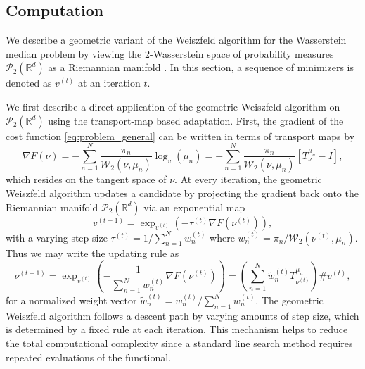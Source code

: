 \documentclass[11pt]{article}
\newcommand{\calP}{\mathcal{P}}
\newcommand{\calW}{\mathcal{W}}
\newcommand{\bbR}{\mathbb{R}}
\begin{document}
\subsection{Computation}

We describe a geometric variant of the Weiszfeld algorithm \citep{weiszfeld_1937_PointPourLequel, fletcher_2009_GeometricMedianRiemannian} for the Wasserstein median problem by viewing the 2-Wasserstein space of probability measures $\calP_2 (\bbR^d)$ as a Riemannian manifold \citep{ambrosio_2021_LecturesOptimalTransport}. In this section, a sequence of minimizers is denoted as $v^{(t)}$ at an iteration $t$. 

We first describe a direct application of the geometric Weiszfeld algorithm on $ \calP_2(\bbR^d)$ using the transport-map based adaptation. First, the gradient of the cost function \eqref{eq:problem_general} can be written in terms of transport maps by
\begin{equation*}
	\nabla F(\nu) = -\sum_{n=1}^N \frac{\pi_n}{\calW_2 (\nu, \mu_n)} \log_v (\mu_n) = -\sum_{n=1}^N \frac{\pi_n}{\calW_2 (\nu, \mu_n)} \left\lbrack T_\nu^{\mu_n} - I \right\rbrack,
\end{equation*}
which resides on the tangent space of $\nu$. At every iteration, the geometric Weiszfeld algorithm updates a candidate by projecting the gradient back onto the Riemannian manifold $\calP_2 (\bbR^d)$ via an exponential map
\begin{equation*}
	v^{(t+1)} = \exp_{v^{(t)}} \left( -\tau^{(t)} \nabla F(\nu^{(t)}) \right),
\end{equation*}
with a varying step size $\tau^{(t)} = 1/\sum_{n=1}^N w_n^{(t)}$ where $w_n^{(t)} = \pi_n / \calW_2 (\nu^{(t)},\mu_n)$. Thus we may write the updating rule as 
\begin{equation}\label{eq:weiszfeld_map}
	\nu^{(t+1)} 
	= \exp_{v^{(t)}} \left(-\frac{1}{\sum_{n=1}^N w_n^{(t)}} \nabla F (\nu^{(t)}) \right)
	= \left(\sum_{n=1}^N  \tilde{w}_{n}^{(t)} T_{\nu^{(t)}}^{\mu_n}  \right) \# v^{(t)},
\end{equation}
for a normalized weight vector $\tilde{w}_{n}^{(t)} = w_n^{(t)}/\sum_{n=1}^N w_n^{(t)}$. 
The geometric Weiszfeld algorithm follows a descent path by varying amounts of step size, which is determined by a fixed rule at each iteration. This mechanism helps to reduce the total computational complexity since a standard line search method requires repeated evaluations of the functional.
\end{document}
